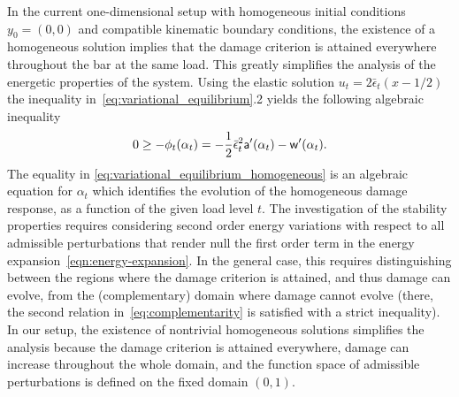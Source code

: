 In the current one-dimensional setup with homogeneous initial conditions $y_0=(0, 0)$ and compatible kinematic boundary conditions, the existence of a homogeneous solution implies that the damage criterion is attained everywhere throughout the bar at the same load. This greatly simplifies the analysis of the energetic properties of the system. 
Using the elastic solution $u_t = 2\bar \epsilon_t(x-1/2)$ 
 the inequality in~\eqref{eq:variational_equilibrium}.2 yields the following algebraic inequality
\begin{equation}
    \label{eq:variational_equilibrium_homogeneous}
    0 \geq -\phi_t(\alpha_t)= -\frac{1}{2}\bar \epsilon_t^2 \mathsf{a}'(\alpha_t)-\mathsf{w}'(\alpha_t).
\end{equation}
The equality in \eqref{eq:variational_equilibrium_homogeneous} is an algebraic equation for $\alpha_t$ which identifies the evolution of the homogeneous damage response, as a function of the given load level $t$.
The investigation of the stability properties requires  
considering second order energy variations with respect to all admissible perturbations that render null the first order term in the energy expansion~\eqref{eqn:energy-expansion}.
In the general case, this requires distinguishing between the regions where the damage criterion is attained, and thus damage can evolve, from the (complementary) domain where damage cannot evolve (there, the second relation in~\eqref{eq:complementarity} is satisfied with a strict inequality).
In our setup, the existence of nontrivial homogeneous solutions simplifies the analysis because the damage criterion is attained everywhere, damage can increase throughout the whole domain, and the function space of admissible perturbations is defined on the fixed domain $(0, 1)$.



